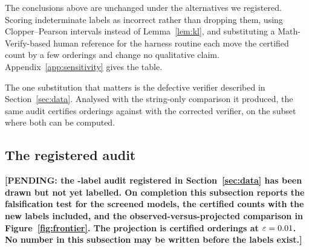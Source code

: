 The conclusions above are unchanged under the alternatives we registered. Scoring
indeterminate labels as incorrect rather than dropping them, using Clopper--Pearson intervals
instead of Lemma~\ref{lem:kl}, and substituting a Math-Verify-based human reference for the
harness routine each move the certified count by a few orderings and change no qualitative
claim. Appendix~\ref{app:sensitivity} gives the table.

The one substitution that matters is the defective verifier described in
Section~\ref{sec:data}. Analysed with the string-only comparison it produced, the same audit
certifies \AnchorStringCombined{} orderings against \AnchorSympyCombined{} with the corrected
verifier, on the subset where both can be computed.

\subsection{The registered audit}

\textbf{[PENDING: the \AuditBudget{}-label audit registered in Section~\ref{sec:data} has been
drawn but not yet labelled. On completion this subsection reports the falsification test for
the \ScreenedModels{} screened models, the certified counts with the new labels included, and
the observed-versus-projected comparison in Figure~\ref{fig:frontier}. The projection is
\ProjectedCertPrereg{} certified orderings at $\varepsilon = 0.01$. No number in this
subsection may be written before the labels exist.]}
